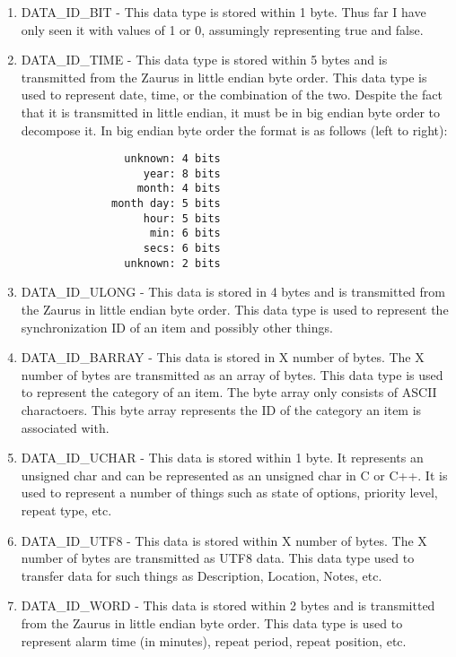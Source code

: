     \begin{enumerate}
    \item DATA\_ID\_BIT - This data type is stored within 1 byte. Thus far I
    have only seen it with values of 1 or 0, assumingly representing true and
    false.

    \item DATA\_ID\_TIME - This data type is stored within 5 bytes and is
    transmitted from the Zaurus in little endian byte order. This data type is
    used to represent date, time, or the combination of the two. Despite the
    fact that it is transmitted in little endian, it must be in big endian byte
    order to decompose it. In big endian byte order the format is as follows
    (left to right):

\begin{verbatim}
                unknown: 4 bits
                   year: 8 bits
                  month: 4 bits
              month day: 5 bits
                   hour: 5 bits
                    min: 6 bits
                   secs: 6 bits
                unknown: 2 bits
\end{verbatim}

    \item DATA\_ID\_ULONG - This data is stored in 4 bytes and is transmitted
    from the Zaurus in little endian byte order. This data type is used to
    represent the synchronization ID of an item and possibly other things.

    \item DATA\_ID\_BARRAY - This data is stored in X number of bytes. The X
    number of bytes are transmitted as an array of bytes. This data type is
    used to represent the category of an item. The byte array only consists of
    ASCII charactoers. This byte array represents the ID of the category an
    item is associated with.

    \item DATA\_ID\_UCHAR - This data is stored within 1 byte. It represents
    an unsigned char and can be represented as an unsigned char in C or
    C++. It is used to represent a number of things such as state of options,
    priority level, repeat type, etc.

    \item DATA\_ID\_UTF8 - This data is stored within X number of bytes. The X
    number of bytes are transmitted as UTF8 data. This data type used to
    transfer data for such things as Description, Location, Notes, etc.

    \item DATA\_ID\_WORD - This data is stored within 2 bytes and is
    transmitted from the Zaurus in little endian byte order. This data type is
    used to represent alarm time (in minutes), repeat period, repeat position,
    etc.

    \end{enumerate}

